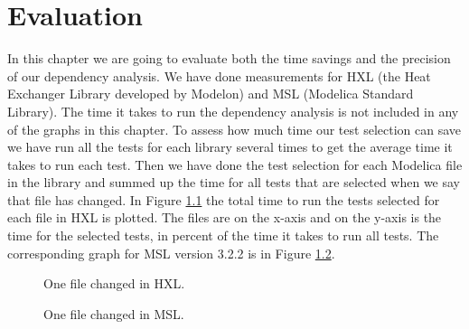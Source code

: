 \documentclass{cslthse-msc}
\begin{document}
\chapter[Evaluation]{Evaluation}
In this chapter we are going to evaluate both the time savings and the precision of our dependency analysis. We have done measurements for HXL (the Heat Exchanger Library developed by Modelon) and MSL (Modelica Standard Library).
The time it takes to run the dependency analysis is not included in any of the graphs in this chapter.
To assess how much time our test selection can save we have run all the tests for each library several times to get the average time it takes to run each test. Then we have done the test selection for each Modelica file in the library and summed up the time for all tests that are selected when we say that file has changed. In Figure \ref{fig:hxlonefile} the total time to run the tests selected for each file in HXL is plotted. The files are on the x-axis and on the y-axis is the time for the selected tests, in percent of the time it takes to run all tests. The corresponding graph for MSL version 3.2.2 is in Figure \ref{fig:mslonefile}.

\begin{figure}[!htbp]
    \centering
    \caption{One file changed in HXL.}
    \label{fig:hxlonefile}
\end{figure}

\begin{figure}[!htbp]
    \centering
    \caption{One file changed in MSL.}
    \label{fig:mslonefile}
\end{figure}
\end{document}
